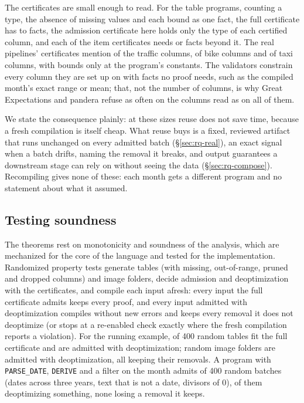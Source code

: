 The certificates are small enough to read. For the \CsPrograms{} table programs, counting a type, the
absence of missing values and each bound as one fact, the full certificate has \CsFullMin{} to
\CsFullMax{} facts, the admission certificate here holds only the type of each certified column, and
each of the \CsItems{} item certificates needs \CsItemMin{} or \CsItemMax{} facts beyond it. The real
pipelines' certificates mention \CsTrafficCols{} of the \CsTrafficFileCols{} traffic columns,
\CsBikesCols{} of \CsBikesFileCols{} bike columns and \CsTaxiCols{} of \CsTaxiFileCols{} taxi columns,
with bounds only at the program's constants. The validators constrain every column they are set up on
with facts no proof needs, such as the compiled month's exact range or mean; that, not the number of
columns, is why Great Expectations and pandera refuse as often on the columns read as on all of them.

We state the consequence plainly: at these sizes reuse does not save time, because a fresh compilation is
itself cheap. What reuse buys is a fixed, reviewed artifact that runs unchanged on every admitted batch
(\S\ref{sec:rq-real}), an exact signal when a batch drifts, naming the removal it breaks, and output
guarantees a downstream stage can rely on without seeing the data (\S\ref{sec:rq-compose}). Recompiling
gives none of these: each month gets a different program and no statement about what it assumed.

\subsection{Testing soundness}\label{sec:soundtest}

The theorems rest on monotonicity and soundness of the analysis, which are mechanized for the core
of the language and tested for the implementation. Randomized property tests generate tables (with missing, out-of-range, pruned and
dropped columns) and image folders, decide admission and deoptimization with the certificates, and
compile each input afresh: every input the full certificate admits keeps every proof, and every input
admitted with deoptimization compiles without new errors and keeps every removal it does not
deoptimize (or stops at a re-enabled check exactly where the fresh compilation reports a violation).
For the running example, \RandFull{} of 400 random tables fit the full certificate and \RandDeopt{} are
admitted with deoptimization; \RandFolders{} random image folders are admitted with deoptimization,
all keeping their removals. A program with \texttt{PARSE\_DATE}, \texttt{DERIVE} and a filter on the
month admits \RandDates{} of 400 random batches (dates across three years, text that is not a date,
divisors of 0), \RandDatesDeopted{} of them deoptimizing something, none losing a removal it keeps.

